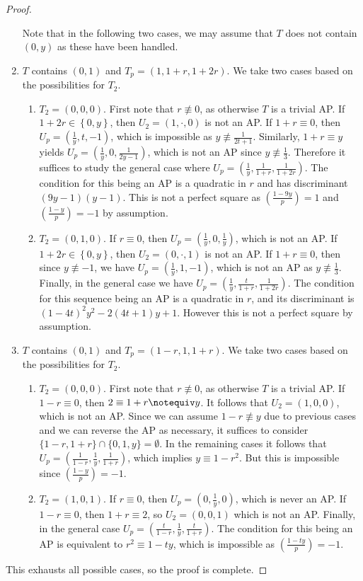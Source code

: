 \documentclass[12pt]{amsart}
\theoremstyle{definition}
\theoremstyle{remark}
\begin{document}
\begin{proof}
\begin{enumerate}
\begin{enumerate}
 \end{enumerate}
 Note that in the following two cases, we may assume that $T$ does not contain $(0, y)$ as these have been handled.
  \item $T$ contains $(0,1)$ and $T_p=(1, 1+r, 1+2r)$. We take two cases based on the possibilities for $T_2$.
 \begin{enumerate}
 \item $T_2=(0, 0, 0)$. First note that $r\nequiv 0$, as otherwise $T$ is a trivial AP. If $1+2r\in \left\{0,y\right\}$, then $U_2=(1,\cdot,0)$ is not an AP. If $1+r\equiv 0$, then $U_p=(\frac{1}{y}, t, -1)$, which is impossible as $y\nequiv \frac{1}{2t+1}$. Similarly, $1+r\equiv y$ yields $U_p=(\frac{1}{y}, 0, \frac{1}{2y-1})$, which is not an AP since $y\nequiv \frac{1}{3}$. Therefore it suffices to study the general case where $U_p=(\frac{1}{y}, \frac{1}{1+r}, \frac{1}{1+2r})$. The condition for this being an AP is a quadratic in $r$ and has discriminant $(9y-1)(y-1)$. This is not a perfect square as $(\frac{1-9y}{p})=1$ and $(\frac{1-y}{p})=-1$ by assumption.
 \item $T_2=(0, 1, 0)$. If $r\equiv 0$, then $U_p=(\frac{1}{y}, 0, \frac{1}{y})$, which is not an AP. If $1+2r\in\left\{0, y\right\}$, then $U_2=(0,\cdot,1)$ is not an AP. If $1+r\equiv 0$, then since $y\nequiv -1$, we have $U_p=(\frac{1}{y}, 1, -1)$, which is not an AP as $y\nequiv \frac{1}{3}$. Finally, in the general case we have $U_p=(\frac{1}{y}, \frac{t}{1+r}, \frac{1}{1+2r})$. The condition for this sequence being an AP is a quadratic in $r$, and its discriminant is $(1-4t)^2y^2-2(4t+1)y+1$. However this is not a perfect square by assumption.
 \end{enumerate}
  \item $T$ contains $(0,1)$ and $T_p=(1-r, 1, 1+r)$. We take two cases based on the possibilities for $T_2$.
 \begin{enumerate}
 \item $T_2=(0, 0, 0)$. First note that $r\nequiv 0$, as otherwise $T$ is a trivial AP. If $1-r\equiv 0$, then $2\equiv 1+r\notequiv y$. 
 It follows that $U_2=(1,0,0)$, which is not an AP. Since we can assume $1-r\nequiv y$ due to previous cases and we can reverse the AP as necessary, it suffices to consider $\{1-r,1+r\}\cap \{0,1,y\}=\emptyset$. In the remaining cases it follows that $U_p=(\frac{1}{1-r}, \frac{1}{y}, \frac{1}{1+r})$, which implies $y\equiv 1-r^2$. But this is impossible since $(\frac{1-y}{p})=-1$.
 \item $T_2=(1, 0, 1)$. If $r\equiv 0$, then $U_p=(0, \frac{1}{y}, 0)$, which is never an AP. If $1-r\equiv 0$, then $1+r\equiv 2$, so $U_2=(0,0,1)$ which is not an AP. Finally, in the general case $U_p=(\frac{t}{1-r}, \frac{1}{y}, \frac{t}{1+r})$. The condition for this being an AP is equivalent to $r^2\equiv1-ty$, which is impossible as $(\frac{1-ty}{p})=-1$.
 \end{enumerate}
 \end{enumerate}
 This exhausts all possible cases, so the proof is complete. 
 \end{proof}
\end{document}
